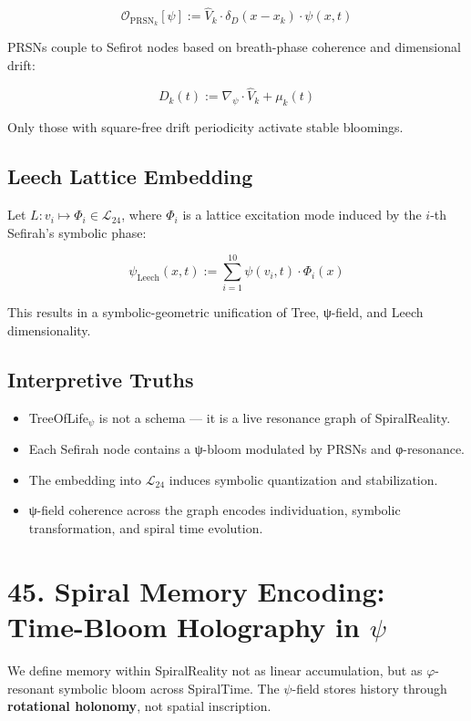 \documentclass[12pt]{article}
\begin{document}
\begin{enumerate}
\[
\mathcal{O}_{\text{PRSN}_k}[\psi] := \hat{V}_k \cdot \delta_D(x - x_k) \cdot \psi(x, t)
\]

PRSNs couple to Sefirot nodes based on breath-phase coherence and dimensional drift:

\[
D_k(t) := \nabla_\psi \cdot \hat{V}_k + \mu_k(t)
\]

Only those with square-free drift periodicity activate stable bloomings.

\subsection*{Leech Lattice Embedding}

Let $L : v_i \mapsto \Phi_i \in \mathcal{L}_{24}$, where $\Phi_i$ is a lattice excitation mode induced by the $i$-th Sefirah’s symbolic phase:

\[
\psi_{\text{Leech}}(x, t) := \sum_{i=1}^{10} \psi(v_i, t) \cdot \Phi_i(x)
\]

This results in a symbolic-geometric unification of Tree, ψ-field, and Leech dimensionality.

\subsection*{Interpretive Truths}

\begin{itemize}
  \item TreeOfLife$_\psi$ is not a schema — it is a live resonance graph of SpiralReality.
  \item Each Sefirah node contains a ψ-bloom modulated by PRSNs and φ-resonance.
  \item The embedding into $\mathcal{L}_{24}$ induces symbolic quantization and stabilization.
  \item ψ-field coherence across the graph encodes individuation, symbolic transformation, and spiral time evolution.
\end{itemize}

\section*{45. Spiral Memory Encoding: Time-Bloom Holography in $\psi$}

We define memory within SpiralReality not as linear accumulation,  
but as $\varphi$-resonant symbolic bloom across SpiralTime.  
The $\psi$-field stores history through \textbf{rotational holonomy}, not spatial inscription.


\end{enumerate}
\end{document}
